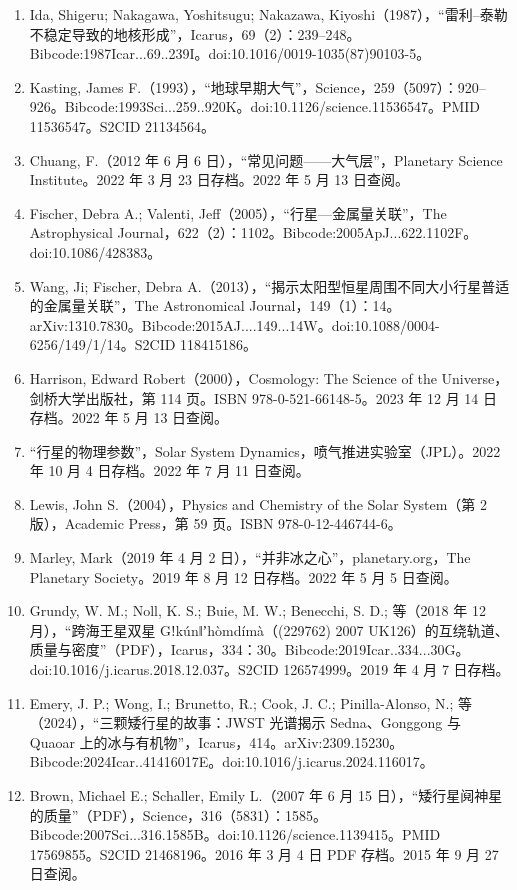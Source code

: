 \begin{enumerate}
\item Ida, Shigeru; Nakagawa, Yoshitsugu; Nakazawa, Kiyoshi（1987），“雷利–泰勒不稳定导致的地核形成”，Icarus，69（2）：239–248。Bibcode:1987Icar...69..239I。doi:10.1016/0019-1035(87)90103-5。
\item Kasting, James F.（1993），“地球早期大气”，Science，259（5097）：920–926。Bibcode:1993Sci...259..920K。doi:10.1126/science.11536547。PMID 11536547。S2CID 21134564。
\item Chuang, F.（2012 年 6 月 6 日），“常见问题——大气层”，Planetary Science Institute。2022 年 3 月 23 日存档。2022 年 5 月 13 日查阅。
\item Fischer, Debra A.; Valenti, Jeff（2005），“行星—金属量关联”，The Astrophysical Journal，622（2）：1102。Bibcode:2005ApJ...622.1102F。doi:10.1086/428383。
\item Wang, Ji; Fischer, Debra A.（2013），“揭示太阳型恒星周围不同大小行星普适的金属量关联”，The Astronomical Journal，149（1）：14。arXiv:1310.7830。Bibcode:2015AJ....149...14W。doi:10.1088/0004-6256/149/1/14。S2CID 118415186。
\item Harrison, Edward Robert（2000），Cosmology: The Science of the Universe，剑桥大学出版社，第 114 页。ISBN 978-0-521-66148-5。2023 年 12 月 14 日存档。2022 年 5 月 13 日查阅。
\item “行星的物理参数”，Solar System Dynamics，喷气推进实验室（JPL）。2022 年 10 月 4 日存档。2022 年 7 月 11 日查阅。
\item Lewis, John S.（2004），Physics and Chemistry of the Solar System（第 2 版），Academic Press，第 59 页。ISBN 978-0-12-446744-6。
\item Marley, Mark（2019 年 4 月 2 日），“并非冰之心”，planetary.org，The Planetary Society。2019 年 8 月 12 日存档。2022 年 5 月 5 日查阅。
\item Grundy, W. M.; Noll, K. S.; Buie, M. W.; Benecchi, S. D.; 等（2018 年 12 月），“跨海王星双星 Gǃkúnǁʼhòmdímà（(229762) 2007 UK126）的互绕轨道、质量与密度”（PDF），Icarus，334：30。Bibcode:2019Icar..334...30G。doi:10.1016/j.icarus.2018.12.037。S2CID 126574999。2019 年 4 月 7 日存档。
\item Emery, J. P.; Wong, I.; Brunetto, R.; Cook, J. C.; Pinilla-Alonso, N.; 等（2024），“三颗矮行星的故事：JWST 光谱揭示 Sedna、Gonggong 与 Quaoar 上的冰与有机物”，Icarus，414。arXiv:2309.15230。Bibcode:2024Icar..41416017E。doi:10.1016/j.icarus.2024.116017。
\item Brown, Michael E.; Schaller, Emily L.（2007 年 6 月 15 日），“矮行星阋神星的质量”（PDF），Science，316（5831）：1585。Bibcode:2007Sci...316.1585B。doi:10.1126/science.1139415。PMID 17569855。S2CID 21468196。2016 年 3 月 4 日 PDF 存档。2015 年 9 月 27 日查阅。

\end{enumerate}
